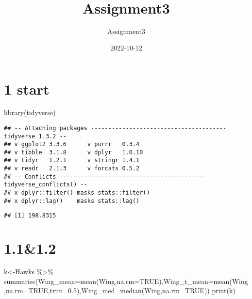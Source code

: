 \documentclass[
]{article}
\title{Assignment3}
\author{Assignment3}
\date{2022-10-12}
\newenvironment{Shaded}{\begin{snugshade}}{\end{snugshade}}
\newcommand{\AttributeTok}[1]{\textcolor[rgb]{0.77,0.63,0.00}{#1}}
\newcommand{\ConstantTok}[1]{\textcolor[rgb]{0.00,0.00,0.00}{#1}}
\newcommand{\FloatTok}[1]{\textcolor[rgb]{0.00,0.00,0.81}{#1}}
\newcommand{\FunctionTok}[1]{\textcolor[rgb]{0.00,0.00,0.00}{#1}}
\newcommand{\NormalTok}[1]{#1}
\newcommand{\OtherTok}[1]{\textcolor[rgb]{0.56,0.35,0.01}{#1}}
\newcommand{\SpecialCharTok}[1]{\textcolor[rgb]{0.00,0.00,0.00}{#1}}
\newcommand{\StringTok}[1]{\textcolor[rgb]{0.31,0.60,0.02}{#1}}
\begin{document}
\maketitle

\hypertarget{start}{%
\section{1 start}\label{start}}

\begin{Shaded}
\begin{Highlighting}[]
\FunctionTok{library}\NormalTok{(tidyverse)}
\end{Highlighting}
\end{Shaded}

\begin{verbatim}
## -- Attaching packages --------------------------------------- tidyverse 1.3.2 --
## v ggplot2 3.3.6      v purrr   0.3.4 
## v tibble  3.1.8      v dplyr   1.0.10
## v tidyr   1.2.1      v stringr 1.4.1 
## v readr   2.1.3      v forcats 0.5.2 
## -- Conflicts ------------------------------------------ tidyverse_conflicts() --
## x dplyr::filter() masks stats::filter()
## x dplyr::lag()    masks stats::lag()
\end{verbatim}

\begin{Shaded}
\end{Shaded}

\begin{verbatim}
## [1] 198.8315
\end{verbatim}

\hypertarget{section}{%
\section{1.1\&1.2}\label{section}}

\begin{Shaded}
\begin{Highlighting}[]
\NormalTok{k}\OtherTok{\textless{}{-}}\NormalTok{Hawks }\SpecialCharTok{\%\textgreater{}\%} \FunctionTok{summarise}\NormalTok{(}\AttributeTok{Wing\_mean=}\FunctionTok{mean}\NormalTok{(Wing,}\AttributeTok{na.rm=}\ConstantTok{TRUE}\NormalTok{),}\AttributeTok{Wing\_t\_mean=}\FunctionTok{mean}\NormalTok{(Wing,}\AttributeTok{na.rm=}\ConstantTok{TRUE}\NormalTok{,}\AttributeTok{trim=}\FloatTok{0.5}\NormalTok{),}\AttributeTok{Wing\_med=}\FunctionTok{median}\NormalTok{(Wing,}\AttributeTok{na.rm=}\ConstantTok{TRUE}\NormalTok{))}
\FunctionTok{print}\NormalTok{(k)}
\end{Highlighting}
\end{Shaded}
\end{document}
